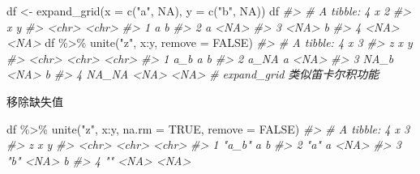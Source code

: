 \documentclass[
]{book}
\newenvironment{Shaded}{\begin{snugshade}}{\end{snugshade}}
\newcommand{\AttributeTok}[1]{\textcolor[rgb]{0.77,0.63,0.00}{#1}}
\newcommand{\CommentTok}[1]{\textcolor[rgb]{0.56,0.35,0.01}{\textit{#1}}}
\newcommand{\ConstantTok}[1]{\textcolor[rgb]{0.00,0.00,0.00}{#1}}
\newcommand{\FunctionTok}[1]{\textcolor[rgb]{0.00,0.00,0.00}{#1}}
\newcommand{\NormalTok}[1]{#1}
\newcommand{\OtherTok}[1]{\textcolor[rgb]{0.56,0.35,0.01}{#1}}
\newcommand{\SpecialCharTok}[1]{\textcolor[rgb]{0.00,0.00,0.00}{#1}}
\newcommand{\StringTok}[1]{\textcolor[rgb]{0.31,0.60,0.02}{#1}}
\begin{document}
\begin{Shaded}
\begin{Highlighting}[]
\NormalTok{df }\OtherTok{\textless{}{-}} \FunctionTok{expand\_grid}\NormalTok{(}\AttributeTok{x =} \FunctionTok{c}\NormalTok{(}\StringTok{"a"}\NormalTok{, }\ConstantTok{NA}\NormalTok{), }\AttributeTok{y =} \FunctionTok{c}\NormalTok{(}\StringTok{"b"}\NormalTok{, }\ConstantTok{NA}\NormalTok{))}
\NormalTok{df}
\CommentTok{\#\textgreater{} \# A tibble: 4 x 2}
\CommentTok{\#\textgreater{}   x     y    }
\CommentTok{\#\textgreater{}   \textless{}chr\textgreater{} \textless{}chr\textgreater{}}
\CommentTok{\#\textgreater{} 1 a     b    }
\CommentTok{\#\textgreater{} 2 a     \textless{}NA\textgreater{} }
\CommentTok{\#\textgreater{} 3 \textless{}NA\textgreater{}  b    }
\CommentTok{\#\textgreater{} 4 \textless{}NA\textgreater{}  \textless{}NA\textgreater{}}
\NormalTok{df }\SpecialCharTok{\%\textgreater{}\%} \FunctionTok{unite}\NormalTok{(}\StringTok{"z"}\NormalTok{, x}\SpecialCharTok{:}\NormalTok{y, }\AttributeTok{remove =} \ConstantTok{FALSE}\NormalTok{)}
\CommentTok{\#\textgreater{} \# A tibble: 4 x 3}
\CommentTok{\#\textgreater{}   z     x     y    }
\CommentTok{\#\textgreater{}   \textless{}chr\textgreater{} \textless{}chr\textgreater{} \textless{}chr\textgreater{}}
\CommentTok{\#\textgreater{} 1 a\_b   a     b    }
\CommentTok{\#\textgreater{} 2 a\_NA  a     \textless{}NA\textgreater{} }
\CommentTok{\#\textgreater{} 3 NA\_b  \textless{}NA\textgreater{}  b    }
\CommentTok{\#\textgreater{} 4 NA\_NA \textless{}NA\textgreater{}  \textless{}NA\textgreater{}}
\CommentTok{\# expand\_grid 类似笛卡尔积功能}
\end{Highlighting}
\end{Shaded}

移除缺失值

\begin{Shaded}
\begin{Highlighting}[]
\NormalTok{df }\SpecialCharTok{\%\textgreater{}\%} \FunctionTok{unite}\NormalTok{(}\StringTok{"z"}\NormalTok{, x}\SpecialCharTok{:}\NormalTok{y, }\AttributeTok{na.rm =} \ConstantTok{TRUE}\NormalTok{, }\AttributeTok{remove =} \ConstantTok{FALSE}\NormalTok{)}
\CommentTok{\#\textgreater{} \# A tibble: 4 x 3}
\CommentTok{\#\textgreater{}   z     x     y    }
\CommentTok{\#\textgreater{}   \textless{}chr\textgreater{} \textless{}chr\textgreater{} \textless{}chr\textgreater{}}
\CommentTok{\#\textgreater{} 1 "a\_b" a     b    }
\CommentTok{\#\textgreater{} 2 "a"   a     \textless{}NA\textgreater{} }
\CommentTok{\#\textgreater{} 3 "b"   \textless{}NA\textgreater{}  b    }
\CommentTok{\#\textgreater{} 4 ""    \textless{}NA\textgreater{}  \textless{}NA\textgreater{}}
\end{Highlighting}
\end{Shaded}
\end{document}
